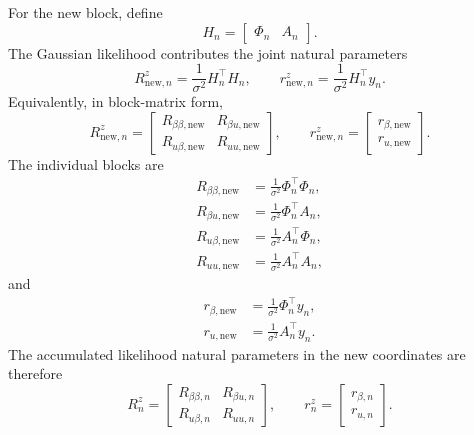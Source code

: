 \documentclass[12pt]{article}
\begin{document}
For the new block, define
\begin{equation}
    H_n=
    \begin{bmatrix}
        \Phi_n & A_n
    \end{bmatrix}.
\end{equation}
The Gaussian likelihood contributes the joint natural parameters
\begin{equation}
    R_{\mathrm{new},n}^z
    =
    \frac{1}{\sigma^2}H_n^\top H_n,
    \qquad
    r_{\mathrm{new},n}^z
    =
    \frac{1}{\sigma^2}H_n^\top y_n.
\end{equation}
Equivalently, in block-matrix form,
\begin{equation}
    R_{\mathrm{new},n}^z
    =
    \begin{bmatrix}
        R_{\beta\beta,\mathrm{new}} & R_{\beta u,\mathrm{new}}\\
        R_{u\beta,\mathrm{new}} & R_{uu,\mathrm{new}}
    \end{bmatrix},
    \qquad
    r_{\mathrm{new},n}^z
    =
    \begin{bmatrix}
        r_{\beta,\mathrm{new}}\\
        r_{u,\mathrm{new}}
    \end{bmatrix}.
    \label{eq:new_block_joint_blocks_matrix}
\end{equation}
The individual blocks are
\begin{align}
    R_{\beta\beta,\mathrm{new}}
    &=\frac{1}{\sigma^2}\Phi_n^\top\Phi_n,\\
    R_{\beta u,\mathrm{new}}
    &=\frac{1}{\sigma^2}\Phi_n^\top A_n,\\
    R_{u\beta,\mathrm{new}}
    &=\frac{1}{\sigma^2}A_n^\top\Phi_n,\\
    R_{uu,\mathrm{new}}
    &=\frac{1}{\sigma^2}A_n^\top A_n,
\end{align}
and
\begin{align}
    r_{\beta,\mathrm{new}}
    &=\frac{1}{\sigma^2}\Phi_n^\top y_n,\\
    r_{u,\mathrm{new}}
    &=\frac{1}{\sigma^2}A_n^\top y_n.
\end{align}
The accumulated likelihood natural parameters in the new coordinates are therefore
\begin{equation}
    R_n^z
    =
    \begin{bmatrix}
        R_{\beta\beta,n} & R_{\beta u,n}\\
        R_{u\beta,n} & R_{uu,n}
    \end{bmatrix},
    \qquad
    r_n^z
    =
    \begin{bmatrix}
        r_{\beta,n}\\
        r_{u,n}
    \end{bmatrix}.
    \label{eq:joint_accumulated_blocks_matrix}
\end{equation}
\end{document}
